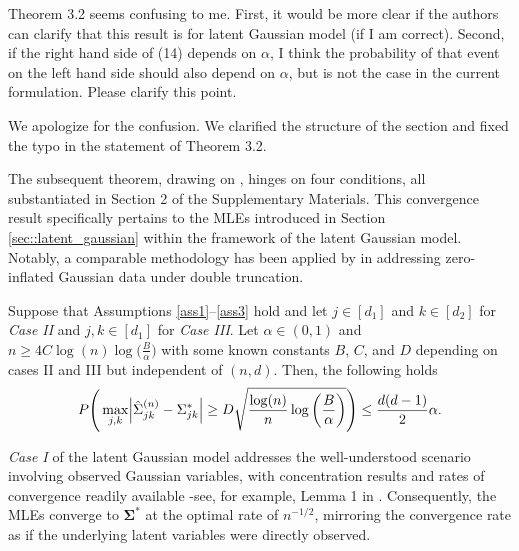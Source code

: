 \begin{point}
    Theorem 3.2 seems confusing to me. First, it would be more clear if the authors can clarify that this result is for latent Gaussian model (if I am correct). Second, if the right hand side of (14) depends on \(\alpha\), I think the probability of that event on the left hand side should also depend on \(\alpha\), but is not the case in the current formulation. Please clarify this point.
\end{point}

\begin{reply}
    We apologize for the confusion. We clarified the structure of the section and fixed the typo in the statement of Theorem 3.2.
\end{reply}

\begin{change}
    The subsequent theorem, drawing on \citet{Mei18}, hinges on four conditions, all substantiated in Section 2 of the Supplementary Materials. This convergence result specifically pertains to the MLEs introduced in Section \ref{sec::latent_gaussian} within the framework of the latent Gaussian model. Notably, a comparable methodology has been applied by \citet{Anne19} in addressing zero-inflated Gaussian data under double truncation.

    \begin{theorem*}
        Suppose that Assumptions \ref{ass1}--\ref{ass3} hold and let $j \in [d_1]$ and $k \in [d_2]$ for  \textit{Case II} and $j,k \in [d_1]$ for \textit{Case III}. Let $\alpha \in (0,1)$ and \(n \geq 4 C \log(n) \log\Big(\frac{B}{\alpha}\Big)\) with some known constants $B$, $C$, and $D$ depending on cases II and III but independent of $(n,d)$. Then, the following holds
        \begin{equation*}
            P\Bigg(\max_{j,k}\abs{\hat{\Sigma}_{jk}^{(n)} - \Sigma_{jk}^{*}} \geq D\sqrt{\frac{\log(n)}{n} \log\bigg(\frac{B}{\alpha}\bigg)}\Bigg) \leq \frac{d(d-1)}{2}\alpha.
        \end{equation*}
    \end{theorem*}
    \textit{Case I} of the latent Gaussian model addresses the well-understood scenario involving observed Gaussian variables, with concentration results and rates of convergence readily available -see, for example, Lemma 1 in \citet{Ravikumar11}. Consequently, the MLEs converge to \(\mathbf{\Sigma}^{*}\) at the optimal rate of \(n^{-1/2}\), mirroring the convergence rate as if the underlying latent variables were directly observed.
\end{change}

